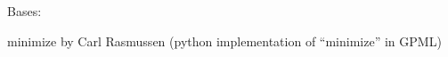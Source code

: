 \documentclass[letterpaper,10pt,english]{sphinxmanual}
\begin{document}

\begin{fulllineitems}
\label{pyGPs.Core:pyGPs.Core.opt.Minimize}
Bases: {\hyperref[pyGPs.Core:pyGPs.Core.opt.Optimizer]{}}

minimize by Carl Rasmussen (python implementation of ``minimize'' in GPML)

\begin{fulllineitems}
\label{pyGPs.Core:pyGPs.Core.opt.Minimize.findMin}
\end{fulllineitems}


\end{fulllineitems}

\end{document}
